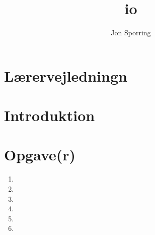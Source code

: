 \documentclass[a4paper,12pt]{article}
\title{io}
\author{Jon Sporring}
\begin{document}
\maketitle

\section{Lærervejledningn}

\section{Introduktion}

\section{Opgave(r)}
\begin{enumerate}
\item 
\item 
\item 
\item 
\item 
\item 
\end{enumerate}
\end{document}
